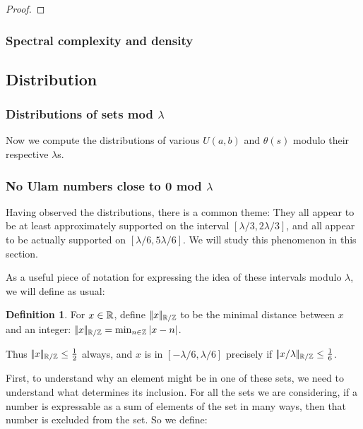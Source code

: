 \documentclass{article}
\theoremstyle{definition}
\newtheorem{definition}{Definition}
\theoremstyle{remark}
\numberwithin{equation}{section}
\begin{document}
{\begin{proof}
\end{proof}

\subsubsection{Spectral complexity and density}


\subsection{Distribution}

\subsubsection{Distributions of sets mod $\lambda$}

Now we compute the distributions of various $U(a,b)$ and $\theta(s)$
modulo their respective $\lambda$s.

}

\subsubsection{No Ulam numbers close to 0 mod $\lambda$}

Having observed the distributions, there is a common theme: They all
appear to be at least approximately supported on the interval
$[\lambda/3, 2\lambda/3]$, and all appear to be actually supported on
$[\lambda/6, 5\lambda/6]$.  We will study this phenomenon in this
section.

As a useful piece of notation for expressing the idea of these
intervals modulo $\lambda$, we will define as usual:

\begin{definition}
For $x \in \mathbb{R}$, define $|\!|x|\!|_{\mathbb{R}/\mathbb{Z}}$ to be the minimal distance between
$x$ and an integer: $|\!|x|\!|_{\mathbb{R}/\mathbb{Z}} = \min_{n \in \mathbb{Z}} |x-n|$.
\end{definition}

Thus $|\!|x|\!|_{\mathbb{R}/\mathbb{Z}} \leq \frac12$ always, and $x$ is in $[-\lambda/6,
\lambda/6]$ precisely if $|\!|x/\lambda|\!|_{\mathbb{R}/\mathbb{Z}} \leq \frac16$.

First, to understand why an element might be in one of these sets, we
need to understand what determines its inclusion.  For all the sets we
are considering, if a number is expressable as a sum of elements of
the set in many ways, then that number is excluded from the set.  So
we define: 
\end{document}
